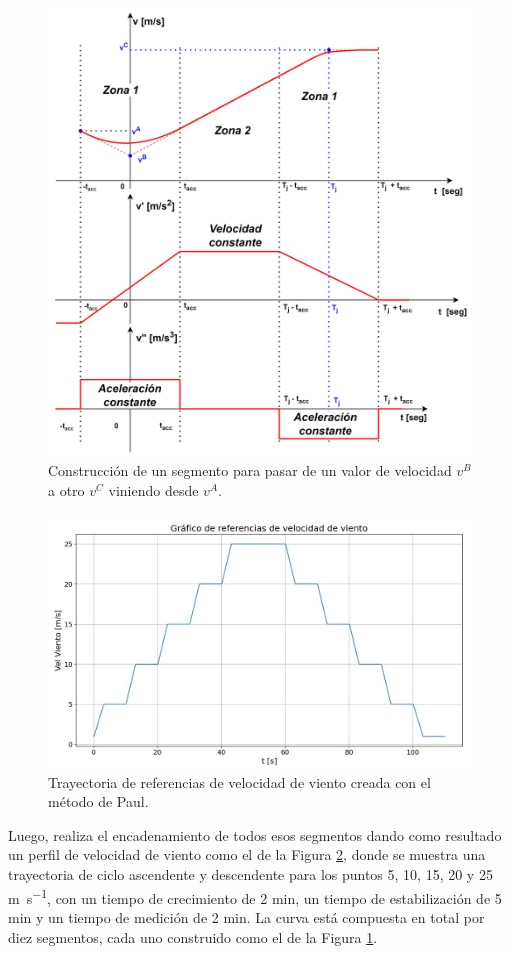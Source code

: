 \begin{figure}[H]
    \centering
    \includegraphics[width=0.75\linewidth]{Figuras/AplicacionWeb/backend/segmentoTrayect.png}
    \caption{Construcción de un segmento para pasar de un valor de velocidad $v^B$ a otro $v^C$ viniendo desde $v^A$.}
    \label{fig:segmentosZona1yZona2}
\end{figure}

\begin{figure}[H]
    \centering
    \includegraphics[width=0.8\linewidth]{Figuras/AplicacionWeb/backend/trayectoriaGenerada.jpg}
    \caption{Trayectoria de referencias de velocidad de viento creada con el método de Paul.}
    \label{fig:trayectoriaGenerada}
\end{figure}

Luego, realiza el encadenamiento de todos esos segmentos dando como resultado un perfil de velocidad de viento como el de la Figura \ref{fig:trayectoriaGenerada}, donde se muestra una trayectoria de ciclo ascendente y descendente para los puntos 5, 10, 15, 20 y 25 \unit{\meter\per\second}, con un tiempo de crecimiento de 2 \unit{\minute}, un tiempo de estabilización de 5 \unit{\minute} y un tiempo de medición de 2 \unit{\minute}. La curva está compuesta en total por diez segmentos, cada uno construido como el de la Figura \ref{fig:segmentosZona1yZona2}.
